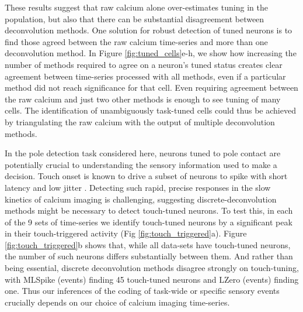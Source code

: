 \documentclass[a4paper,11pt]{article}
\begin{document}
These results suggest that raw calcium alone over-estimates tuning in the population, but also that there can be substantial disagreement between deconvolution methods. One solution for robust detection of tuned neurons is to find those agreed between the raw calcium time-series and more than one deconvolution method. In Figure \ref{fig:tuned_cells}e-h, we show how increasing the number of methods required to agree on a neuron's tuned status creates clear agreement between time-series processed with all methods, even if a particular method did not reach significance for that cell. Even requiring agreement between the raw calcium and just two other methods is enough to see tuning of many cells. The identification of unambiguously task-tuned cells could thus be achieved by triangulating the raw calcium with the output of multiple deconvolution methods.

In the pole detection task considered here, neurons tuned to pole contact are potentially crucial to understanding the sensory information used to make a decision. Touch onset is known to drive a subset of neurons to spike with short latency and low jitter \citep{OConnor2010-hd, Hires2015-by}. Detecting such rapid, precise responses in the slow kinetics of calcium imaging is challenging, suggesting discrete-deconvolution methods might be necessary to detect touch-tuned neurons. To test this, in each of the 9 sets of time-series we identify touch-tuned neurons by a significant peak in their touch-triggered activity (Fig \ref{fig:touch_triggered}a). Figure \ref{fig:touch_triggered}b shows that, while all data-sets have touch-tuned neurons, the number of such neurons differs substantially between them. And rather than being essential, discrete deconvolution methods disagree strongly on touch-tuning, with MLSpike (events) finding 45 touch-tuned neurons and LZero (events) finding one. Thus our inferences of the coding of task-wide or specific sensory events crucially depends on our choice of calcium imaging time-series.
\end{document}
